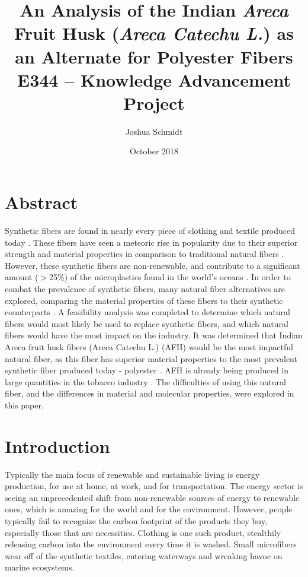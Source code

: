 \documentclass{article}
\title{%
	An Analysis of the Indian \textit{Areca} Fruit Husk (\textit{Areca Catechu L.}) as an Alternate for Polyester Fibers \\
	\large E344 – Knowledge Advancement Project}
\date{October 2018}
\author{Joshua Schmidt }
\begin{document}
\maketitle
\section{Abstract}

Synthetic fibers are found in nearly every piece of clothing and textile produced today \autocite{ihsmarkit}. These fibers have seen a meteoric rise in popularity due to their superior strength and material properties in comparison to traditional natural fibers \autocite{craftechindustries}. However, these synthetic fibers are non-renewable, and contribute to a significant amount ($>$25\%) of the microplastics found in the world's oceans \autocite{quantifyingfibers}\autocite{noaamicroplastics}. In order to combat the prevalence of synthetic fibers, many natural fiber alternatives are explored, comparing the material properties of these fibers to their synthetic counterparts \autocite{naturalfiberreview}. A feasibility analysis was completed to determine which natural fibers would most likely be used to replace synthetic fibers, and which natural fibers would have the most impact on the industry. It was determined that Indian Areca fruit husk fibers (Areca Catechu L.) (AFH) would be the most impactful natural fiber, as this fiber has superior material properties to the most prevalent synthetic fiber produced today - polyester \autocite{afhfiber}. AFH is already being produced in large quantities in the tobacco industry \autocite{afhfiber}. The difficulties of using this natural fiber, and the differences in material and molecular properties, were explored in this paper.

\section{Introduction}

Typically the main focus of renewable and sustainable living is energy production, for use at home, at work, and for transportation. The energy sector is seeing an unprecedented shift from non-renewable sources of energy to renewable ones, which is amazing for the world and for the environment. However, people typically fail to recognize the carbon footprint of the products they buy, especially those that are necessities. Clothing is one such product, stealthily releasing carbon into the environment every time it is washed. Small microfibers wear off of the synthetic textiles, entering waterways and wreaking havoc on marine ecosystems.
\end{document}
